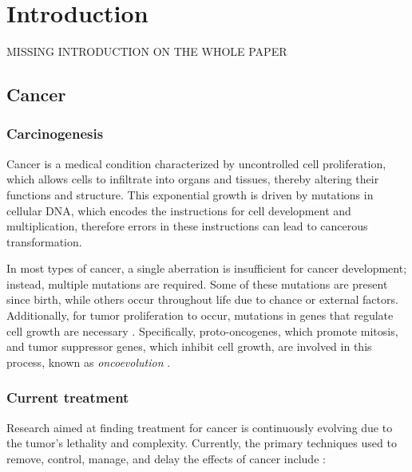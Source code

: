 \chapter{Introduction} \label{chap:introduction}

MISSING INTRODUCTION ON THE WHOLE PAPER 

\section{Cancer}

\subsection{Carcinogenesis}

Cancer is a medical condition characterized by uncontrolled cell proliferation, which allows cells to infiltrate into organs and tissues, thereby altering their functions and structure. This exponential growth is driven by mutations in cellular DNA, which encodes the instructions for cell development and multiplication, therefore errors in these instructions can lead to cancerous transformation.

In most types of cancer, a single aberration is insufficient for cancer development; instead, multiple mutations are required. Some of these mutations are present since birth, while others occur throughout life due to chance or external factors. Additionally, for tumor proliferation to occur, mutations in genes that regulate cell growth are necessary \cite{Vogelstein2004}. Specifically, proto-oncogenes, which promote mitosis, and tumor suppressor genes, which inhibit cell growth, are involved in this process, known as \textit{oncoevolution} \cite{carcinogenesis}. 

\subsection{Current treatment}

Research aimed at finding treatment for cancer is continuously evolving due to the tumor's lethality and complexity. Currently, the primary techniques used to remove, control, manage, and delay the effects of cancer include \cite{cancer_treat}:

